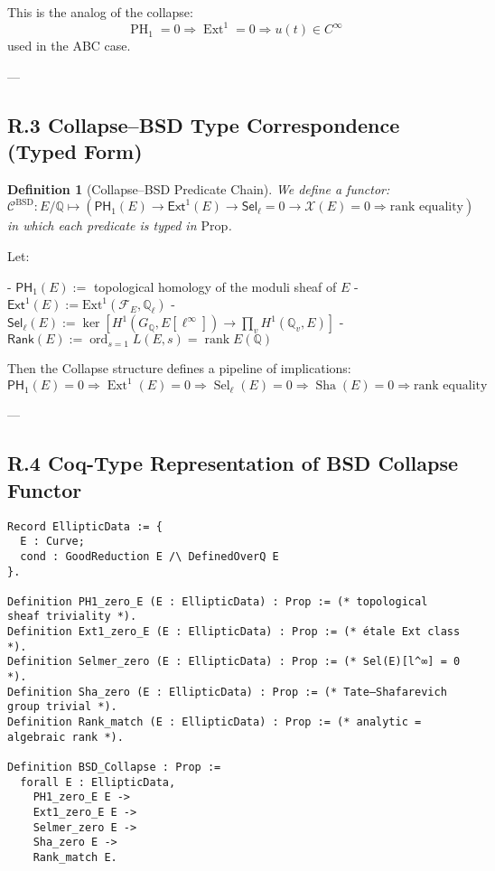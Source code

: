 \documentclass[11pt]{article}
\newtheorem{definition}[theorem]{Definition}
\DeclareMathOperator{\Ext}{Ext}
\DeclareMathOperator{\PH}{PH}
\newcommand{\Sha}{\mathcal{X}}
\begin{document}
This is the analog of the collapse:
\[
\PH_1 = 0 \Rightarrow \Ext^1 = 0 \Rightarrow u(t) \in C^\infty
\]
used in the ABC case.

---

\subsection*{R.3 Collapse–BSD Type Correspondence (Typed Form)}

\begin{definition}[Collapse–BSD Predicate Chain]
We define a functor:
\[
\mathcal{C}^{\mathrm{BSD}} : E/\mathbb{Q} \mapsto \left(
\mathsf{PH}_1(E) \to \mathsf{Ext}^1(E) \to \mathsf{Sel}_\ell = 0 \to \Sha(E) = 0 \Rightarrow \text{rank equality}
\right)
\]
in which each predicate is typed in \( \mathrm{Prop} \).
\end{definition}

Let:

- \( \mathsf{PH}_1(E) := \) topological homology of the moduli sheaf of \( E \)
- \( \mathsf{Ext}^1(E) := \mathrm{Ext}^1(\mathcal{F}_E, \mathbb{Q}_\ell) \)
- \( \mathsf{Sel}_\ell(E) := \ker[ H^1(G_\mathbb{Q}, E[\ell^\infty]) \to \prod_v H^1(\mathbb{Q}_v, E) ] \)
- \( \mathsf{Rank}(E) := \operatorname{ord}_{s=1} L(E,s) = \operatorname{rank} E(\mathbb{Q}) \)

Then the Collapse structure defines a pipeline of implications:
\[
\mathsf{PH}_1(E) = 0
\Rightarrow \operatorname{Ext}^1(E) = 0
\Rightarrow \operatorname{Sel}_\ell(E) = 0
\Rightarrow \operatorname{Sha}(E) = 0
\Rightarrow \text{rank equality}
\]

---

\subsection*{R.4 Coq-Type Representation of BSD Collapse Functor}

\begin{verbatim}
Record EllipticData := {
  E : Curve;
  cond : GoodReduction E /\ DefinedOverQ E
}.

Definition PH1_zero_E (E : EllipticData) : Prop := (* topological sheaf triviality *).
Definition Ext1_zero_E (E : EllipticData) : Prop := (* étale Ext class *).
Definition Selmer_zero (E : EllipticData) : Prop := (* Sel(E)[l^∞] = 0 *).
Definition Sha_zero (E : EllipticData) : Prop := (* Tate–Shafarevich group trivial *).
Definition Rank_match (E : EllipticData) : Prop := (* analytic = algebraic rank *).

Definition BSD_Collapse : Prop :=
  forall E : EllipticData,
    PH1_zero_E E ->
    Ext1_zero_E E ->
    Selmer_zero E ->
    Sha_zero E ->
    Rank_match E.
\end{verbatim}
\end{document}
